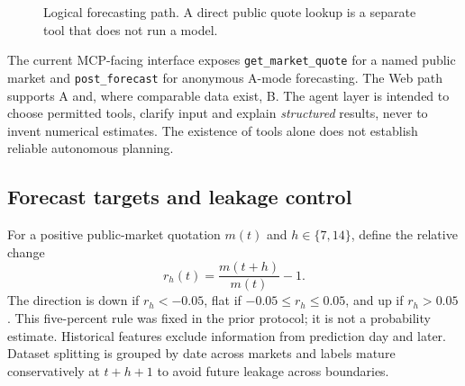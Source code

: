 \documentclass[11pt,a4paper]{article}
\begin{document}
\begin{figure}[ht]
\centering
{}
\caption{Logical forecasting path. A direct public quote lookup is a separate tool that does not run a model.}
\label{fig:architecture}
\end{figure}

The current MCP-facing interface exposes \texttt{get\_market\_quote} for a named public market and \texttt{post\_forecast} for anonymous A-mode forecasting. The Web path supports A and, where comparable data exist, B. The agent layer is intended to choose permitted tools, clarify input and explain \emph{structured} results, never to invent numerical estimates. The existence of tools alone does not establish reliable autonomous planning.

\subsection{Forecast targets and leakage control}
For a positive public-market quotation $m(t)$ and $h\in\{7,14\}$, define the relative change
\begin{equation}
r_h(t)=\frac{m(t+h)}{m(t)}-1.
\end{equation}
The direction is down if $r_h<-0.05$, flat if $-0.05\leq r_h\leq0.05$, and up if $r_h>0.05$. This five-percent rule was fixed in the prior protocol; it is not a probability estimate. Historical features exclude information from prediction day and later. Dataset splitting is grouped by date across markets and labels mature conservatively at $t+h+1$ to avoid future leakage across boundaries.
\end{document}
